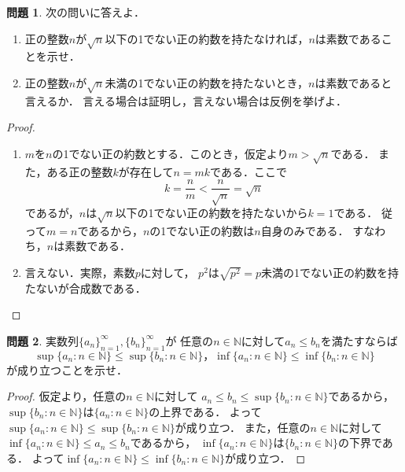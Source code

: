 \documentclass{jsarticle}
\theoremstyle{definition}
\newtheorem{qst}{問題}
\begin{document}
\begin{qst}
次の問いに答えよ．
\begin{enumerate}
\item 正の整数$n$が$\sqrt{n}$以下の1でない正の約数を持たなければ，$n$は素数であることを示せ．
\item 正の整数$n$が$\sqrt{n}$未満の1でない正の約数を持たないとき，$n$は素数であると言えるか．
言える場合は証明し，言えない場合は反例を挙げよ．
\end{enumerate}
\end{qst}
\begin{proof}
\begin{enumerate}
\item $m$を$n$の1でない正の約数とする．このとき，仮定より$m>\sqrt{n}$である．
また，ある正の整数$k$が存在して$n=mk$である．ここで
\[ k=\frac{n}{m}<\frac{n}{\sqrt{n}}=\sqrt{n} \]
であるが，$n$は$\sqrt{n}$以下の1でない正の約数を持たないから$k=1$である．
従って$m=n$であるから，$n$の1でない正の約数は$n$自身のみである．
すなわち，$n$は素数である．
\item 言えない．実際，素数$p$に対して，
$p^2$は$\sqrt{p^2}=p$未満の1でない正の約数を持たないが合成数である．
\end{enumerate}
\end{proof}

\begin{qst}
実数列$\{a_n\}_{n=1}^\infty,\{b_n\}_{n=1}^\infty$が
任意の$n\in\mathbb{N}$に対して$a_n\leq b_n$を満たすならば
\[
\sup\{a_n:n\in\mathbb{N}\}\leq\sup\{b_n:n\in\mathbb{N}\}，
\inf\{a_n:n\in\mathbb{N}\}\leq\inf\{b_n:n\in\mathbb{N}\}
\]
が成り立つことを示せ．
\end{qst}
\begin{proof}
仮定より，任意の$n\in\mathbb{N}$に対して
$a_n\leq b_n\leq\sup\{b_n:n\in\mathbb{N}\}$であるから，
$\sup\{b_n:n\in\mathbb{N}\}$は$\{a_n:n\in\mathbb{N}\}$の上界である．
よって$\sup\{a_n:n\in\mathbb{N}\}\leq\sup\{b_n:n\in\mathbb{N}\}$が成り立つ．
また，任意の$n\in\mathbb{N}$に対して
$\inf\{a_n:n\in\mathbb{N}\}\leq a_n\leq b_n$であるから，
$\inf\{a_n:n\in\mathbb{N}\}$は$\{b_n:n\in\mathbb{N}\}$の下界である．
よって$\inf\{a_n:n\in\mathbb{N}\}\leq\inf\{b_n:n\in\mathbb{N}\}$が成り立つ．
\end{proof}
\end{document}
